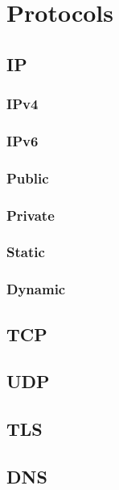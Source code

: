 \chapter{Protocols}%

\section{IP}

\subsection{IPv4}

\subsection{IPv6}

\subsection{Public}

\subsection{Private}

\subsection{Static}

\subsection{Dynamic}

\section{TCP}

\section{UDP}

\section{TLS}

\section{DNS}

